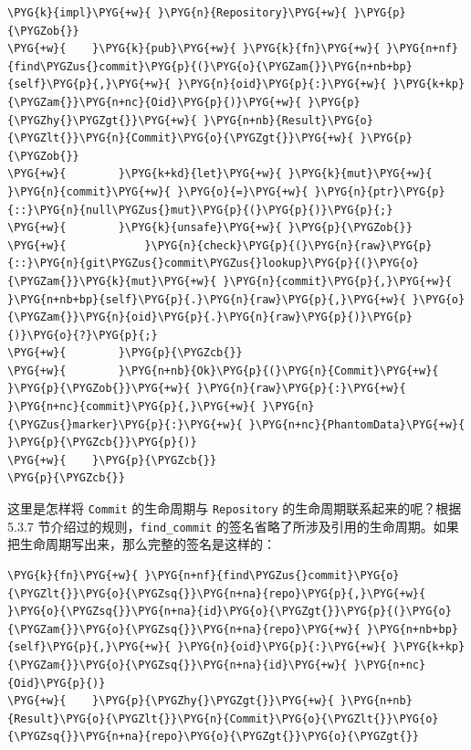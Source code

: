 \begin{Verbatim}[commandchars=\\\{\},breaklines=true,breakanywhere=true,fontsize=\codefont,xleftmargin=17bp]
\PYG{k}{impl}\PYG{+w}{ }\PYG{n}{Repository}\PYG{+w}{ }\PYG{p}{\PYGZob{}}
\PYG{+w}{    }\PYG{k}{pub}\PYG{+w}{ }\PYG{k}{fn}\PYG{+w}{ }\PYG{n+nf}{find\PYGZus{}commit}\PYG{p}{(}\PYG{o}{\PYGZam{}}\PYG{n+nb+bp}{self}\PYG{p}{,}\PYG{+w}{ }\PYG{n}{oid}\PYG{p}{:}\PYG{+w}{ }\PYG{k+kp}{\PYGZam{}}\PYG{n+nc}{Oid}\PYG{p}{)}\PYG{+w}{ }\PYG{p}{\PYGZhy{}\PYGZgt{}}\PYG{+w}{ }\PYG{n+nb}{Result}\PYG{o}{\PYGZlt{}}\PYG{n}{Commit}\PYG{o}{\PYGZgt{}}\PYG{+w}{ }\PYG{p}{\PYGZob{}}
\PYG{+w}{        }\PYG{k+kd}{let}\PYG{+w}{ }\PYG{k}{mut}\PYG{+w}{ }\PYG{n}{commit}\PYG{+w}{ }\PYG{o}{=}\PYG{+w}{ }\PYG{n}{ptr}\PYG{p}{::}\PYG{n}{null\PYGZus{}mut}\PYG{p}{(}\PYG{p}{)}\PYG{p}{;}
\PYG{+w}{        }\PYG{k}{unsafe}\PYG{+w}{ }\PYG{p}{\PYGZob{}}
\PYG{+w}{            }\PYG{n}{check}\PYG{p}{(}\PYG{n}{raw}\PYG{p}{::}\PYG{n}{git\PYGZus{}commit\PYGZus{}lookup}\PYG{p}{(}\PYG{o}{\PYGZam{}}\PYG{k}{mut}\PYG{+w}{ }\PYG{n}{commit}\PYG{p}{,}\PYG{+w}{ }\PYG{n+nb+bp}{self}\PYG{p}{.}\PYG{n}{raw}\PYG{p}{,}\PYG{+w}{ }\PYG{o}{\PYGZam{}}\PYG{n}{oid}\PYG{p}{.}\PYG{n}{raw}\PYG{p}{)}\PYG{p}{)}\PYG{o}{?}\PYG{p}{;}
\PYG{+w}{        }\PYG{p}{\PYGZcb{}}
\PYG{+w}{        }\PYG{n+nb}{Ok}\PYG{p}{(}\PYG{n}{Commit}\PYG{+w}{ }\PYG{p}{\PYGZob{}}\PYG{+w}{ }\PYG{n}{raw}\PYG{p}{:}\PYG{+w}{ }\PYG{n+nc}{commit}\PYG{p}{,}\PYG{+w}{ }\PYG{n}{\PYGZus{}marker}\PYG{p}{:}\PYG{+w}{ }\PYG{n+nc}{PhantomData}\PYG{+w}{ }\PYG{p}{\PYGZcb{}}\PYG{p}{)}
\PYG{+w}{    }\PYG{p}{\PYGZcb{}}
\PYG{p}{\PYGZcb{}}
\end{Verbatim}

这里是怎样将 \texttt{Commit} 的生命周期与 \texttt{Repository} 的生命周期联系起来的呢？根据 5.3.7 节介绍过的规则，\texttt{find\_commit} 的签名省略了所涉及引用的生命周期。如果把生命周期写出来，那么完整的签名是这样的：

\begin{Verbatim}[commandchars=\\\{\},breaklines=true,breakanywhere=true,fontsize=\codefont,xleftmargin=17bp]
\PYG{k}{fn}\PYG{+w}{ }\PYG{n+nf}{find\PYGZus{}commit}\PYG{o}{\PYGZlt{}}\PYG{o}{\PYGZsq{}}\PYG{n+na}{repo}\PYG{p}{,}\PYG{+w}{ }\PYG{o}{\PYGZsq{}}\PYG{n+na}{id}\PYG{o}{\PYGZgt{}}\PYG{p}{(}\PYG{o}{\PYGZam{}}\PYG{o}{\PYGZsq{}}\PYG{n+na}{repo}\PYG{+w}{ }\PYG{n+nb+bp}{self}\PYG{p}{,}\PYG{+w}{ }\PYG{n}{oid}\PYG{p}{:}\PYG{+w}{ }\PYG{k+kp}{\PYGZam{}}\PYG{o}{\PYGZsq{}}\PYG{n+na}{id}\PYG{+w}{ }\PYG{n+nc}{Oid}\PYG{p}{)}
\PYG{+w}{    }\PYG{p}{\PYGZhy{}\PYGZgt{}}\PYG{+w}{ }\PYG{n+nb}{Result}\PYG{o}{\PYGZlt{}}\PYG{n}{Commit}\PYG{o}{\PYGZlt{}}\PYG{o}{\PYGZsq{}}\PYG{n+na}{repo}\PYG{o}{\PYGZgt{}}\PYG{o}{\PYGZgt{}}
\end{Verbatim}

